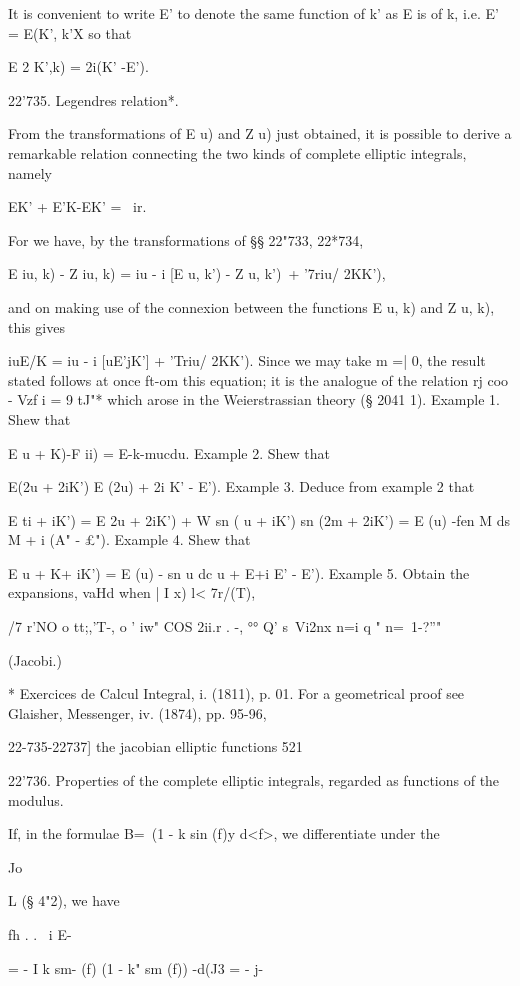 It is convenient to write E' to denote the same function of k' as E is
of k, i.e. E' = E(K', k'X so that

E 2 K',k) = 2i(K' -E').

22'735. Legendres relation*.

From the transformations of E u) and Z u) just obtained, it is
possible to derive a remarkable relation connecting the two kinds of
complete elliptic integrals, namely

EK' + E'K-EK' = \ ir.

For we have, by the transformations of §§ 22"733, 22*734,

E iu, k) - Z iu, k) = iu - i [E u, k') - Z u, k')\ + '7riu/ 2KK'),

and on making use of the connexion between the functions E u, k) and Z
u, k), this gives

iuE/K = iu - i [uE'jK'] + 'Triu/ 2KK'). Since we may take m =| 0, the
result stated follows at once ft-om this equation; it is the analogue
of the relation rj coo - Vzf i = 9 tJ"* which arose in the
Weierstrassian theory (§ 2041 1). Example 1. Shew that

E u + K)-F ii) = E-k-mucdu. Example 2. Shew that

E(2u + 2iK') E (2u) + 2i K' - E'). Example 3. Deduce from example 2
that

E ti + iK') = E 2u + 2iK') + W sn ( u + iK') sn (2m + 2iK') = E (u)
-fen M ds M + i (A" - £"). Example 4. Shew that

E u + K+ iK') = E (u) - sn u dc u + E+i E' - E'). Example 5. Obtain
the expansions, vaHd when | I x) l< 7r/(T),

/7 r'NO o tt;,'T-, o ' iw" COS 2ii.r . -, °° Q' s\ Vi2nx n=i q " n=\
1-?''"

(Jacobi.)

* Exercices de Calcul Integral, i. (1811), p. 01. For a geometrical
proof see Glaisher, Messenger, iv. (1874), pp. 95-96,

22-735-22737] the jacobian elliptic functions 521

22'736. Properties of the complete elliptic integrals, regarded as
functions of the modulus.

If, in the formulae B=\ (1 - k sin (f)y d<f>, we differentiate under
the

Jo

L (§ 4"2), we have

fh . . \ i E-

= - I k sm- (f) (1 - k" sm (f)) -d(J3 = - j-


